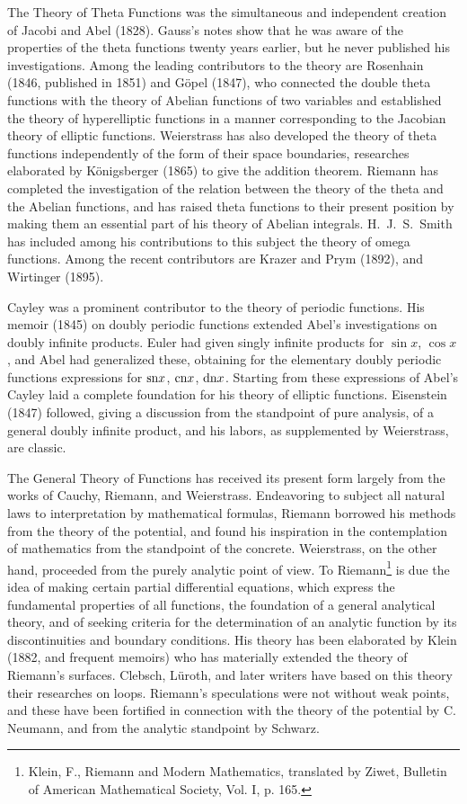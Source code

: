 \documentclass[oneside]{book}
\begin{document}
The Theory of Theta Functions was the simultaneous and independent
creation of Jacobi and Abel (1828). Gauss's notes show that he was
aware of the properties of the theta functions twenty years earlier,
but he never published his investigations. Among the leading
contributors to the theory are Rosenhain (1846, published in 1851)
and G\"opel (1847), who connected the double theta functions with
the theory of Abelian functions of two variables and established the
theory of hyperelliptic functions in a manner corresponding to the
Jacobian theory of elliptic functions. Weierstrass has also
developed the theory of theta functions independently of the form of
their space boundaries, researches elaborated by K\"onigsberger
(1865) to give the addition theorem. Riemann has completed the
investigation of the relation between the theory of the theta and
the Abelian functions, and has raised theta functions to their
present position by making them an essential part of his theory of
Abelian integrals. H.~J.~S.~Smith has included among his
contributions to this subject the theory of omega functions. Among
the recent contributors are Krazer and Prym (1892), and Wirtinger
(1895).

Cayley was a prominent contributor to the theory of periodic
functions. His memoir (1845) on doubly periodic functions extended
Abel's investigations on doubly infinite products. Euler had given
singly infinite products for $\sin x$, $\cos x$, and Abel had
generalized these, obtaining for the elementary doubly periodic
functions expressions for $\hbox{sn} x$, $\hbox{cn} x$, $\hbox{dn}
x$. Starting from these expressions of Abel's Cayley laid a complete
foundation for his theory of elliptic functions. Eisenstein (1847)
followed, giving a discussion from the standpoint of pure analysis,
of a general doubly infinite product, and his labors, as
supplemented by Weierstrass, are classic.

The General Theory of Functions has received its present form
largely from the works of Cauchy, Riemann, and
Weierstrass. Endeavoring to subject all natural laws to
interpretation by mathematical formulas, Riemann borrowed his
methods from the theory of the potential, and found his inspiration
in the contemplation of mathematics from the standpoint of the
concrete. Weierstrass, on the other hand, proceeded from the purely
analytic point of view. To Riemann\footnote{Klein, F., Riemann and
Modern Mathematics, translated by Ziwet, Bulletin of American
Mathematical Society, Vol. I, p. 165.} is due the idea of making
certain partial differential equations, which express the
fundamental properties of all functions, the foundation of a general
analytical theory, and of seeking criteria for the determination of
an analytic function by its discontinuities and boundary
conditions. His theory has been elaborated by Klein (1882, and
frequent memoirs) who has materially extended the theory of
Riemann's surfaces. Clebsch, L\"uroth, and later writers have based on
this theory their researches on loops. Riemann's speculations were
not without weak points, and these have been fortified in connection
with the theory of the potential by C. Neumann, and from the
analytic standpoint by Schwarz.
\end{document}
